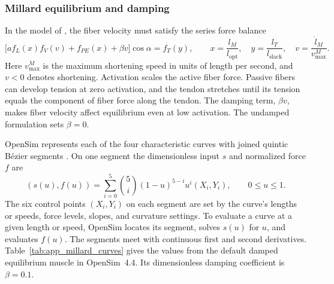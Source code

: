 \subsubsection{Millard equilibrium and damping}

In the model of \citet{millard_flexing_2013}, the fiber velocity must satisfy the series force balance
\begin{equation}
 \big[a f_L(x)f_V(v)+f_{PE}(x)+\beta v\big]\cos\alpha=f_T(y),
 \qquad x=\frac{l_M}{l_{\mathrm{opt}}},\quad
 y=\frac{l_T}{l_{\mathrm{slack}}},\quad v=\frac{\dot l_M}{v_{\mathrm{max}}^M}.
 \label{eq:app_millard_equilibrium}
\end{equation}
Here $v_{\mathrm{max}}^M$ is the maximum shortening speed in units of length per second, and $v<0$ denotes shortening. Activation scales the active fiber force. Passive fibers can develop tension at zero activation, and the tendon stretches until its tension equals the component of fiber force along the tendon. The damping term, $\beta v$, makes fiber velocity affect equilibrium even at low activation. The undamped formulation sets $\beta=0$.

OpenSim represents each of the four characteristic curves with joined quintic B\'ezier segments \citep{millard_flexing_2013,opensim_muscle_curves_44}. On one segment the dimensionless input $s$ and normalized force $f$ are
\begin{equation}
 (s(u),f(u))=\sum_{i=0}^{5}\binom{5}{i}(1-u)^{5-i}u^i(X_i,Y_i),
 \qquad 0\leq u\leq1.
 \label{eq:app_millard_bezier}
\end{equation}
The six control points $(X_i,Y_i)$ on each segment are set by the curve's lengths or speeds, force levels, slopes, and curvature settings. To evaluate a curve at a given length or speed, OpenSim locates its segment, solves $s(u)$ for $u$, and evaluates $f(u)$. The segments meet with continuous first and second derivatives. Table~\ref{tab:app_millard_curves} gives the values from the default damped equilibrium muscle in OpenSim~4.4. Its dimensionless damping coefficient is $\beta=0.1$.

